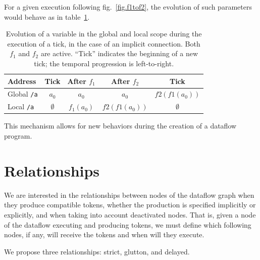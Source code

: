 \documentclass{article}
\begin{document}
For a given execution following fig.~\ref{fig.f1tof2}, the evolution of such parameters would behave as in table~\ref{tbl.evolution}.

\begin{table}[h]
	\centering
	\footnotesize
	\begin{tabular}{l|cccc}
		Address & Tick & After $f_1$ & After $f_2$ & Tick \\
		\midrule
		Global \lstinline|/a|  & $a_0$ & $a_0$ & $a_0$ & $f2(f1(a_0))$\\
		Local \lstinline|/a|   & $\emptyset$ & $f_1(a_0)$ & $f2(f1(a_0))$ & $\emptyset$ \\	
	\end{tabular}
	\caption{Evolution of a variable in the global and local scope during the execution of a tick, in the case of an implicit connection. Both $f_1$ and $f_2$ are active. 
        ``Tick'' indicates the beginning of a new tick; the temporal progression is left-to-right.}
	\label{tbl.evolution}
\end{table}

This mechanism allows for new behaviors during the creation of a dataflow program.

	
	
    
\section{Relationships}
\label{sec.relationships}
We are interested in the relationships between nodes of the dataflow graph when they produce compatible tokens, whether the production is specified implicitly or explicitly, and when taking into account deactivated nodes.
That is, given a node of the dataflow executing and producing tokens, we must define which following nodes, if any, will receive the tokens and when will they execute.
    
We propose three relationships: strict, glutton, and delayed.
\end{document}
